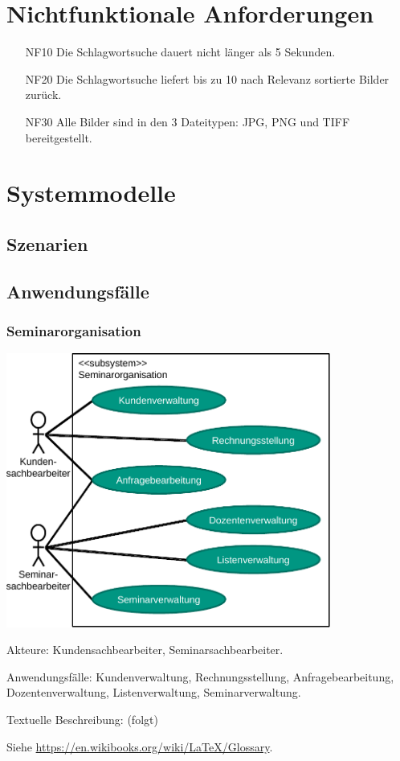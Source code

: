 \documentclass[parskip=full]{scrartcl}
\begin{document}
\section{Nichtfunktionale Anforderungen}
\begin{itemize}[nosep]
\item[NF10] Die Schlagwortsuche dauert nicht l\"anger als 5 Sekunden.
\item[NF20] Die Schlagwortsuche liefert bis zu 10 nach Relevanz sortierte Bilder zur\"uck.
\item[NF30] Alle Bilder sind in den 3 Dateitypen: JPG, PNG und TIFF bereitgestellt.
\end{itemize}

\section{Systemmodelle}

\subsection{Szenarien}

\subsection{Anwendungsfälle}
\subsubsection{Seminarorganisation}
\begin{center}
\includegraphics[width=0.8\textwidth]{szenario_seminarorganisation.pdf}
\end{center}

Akteure: Kundensachbearbeiter, Seminarsachbearbeiter.

Anwendungsfälle: Kundenverwaltung, Rechnungsstellung, Anfragebearbeitung, Dozentenverwaltung, Listenverwaltung, Seminarverwaltung.

Textuelle Beschreibung: (folgt)



%
%
\printnoidxglossaries
Siehe \url{https://en.wikibooks.org/wiki/LaTeX/Glossary}.
\end{document}

